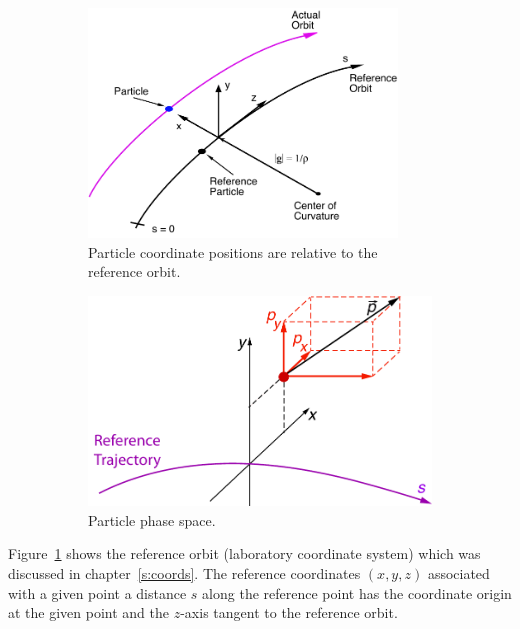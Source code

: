 \documentclass{hitec}     %
\begin{document}
{\begin{figure}[tb]
  \centering
  \begin{subfigure}[t]{0.48\textwidth}
    \includegraphics[width=0.9\textwidth]{figures/local-coords.pdf}
    \caption{Particle coordinate positions are relative to the reference orbit.}
    \label{f:part.coords}
  \end{subfigure}
  \hfil
  \begin{subfigure}[t]{0.48\textwidth}
    \includegraphics[width=\textwidth]{figures/CoordinateSystem1.pdf}
    \caption{Particle phase space.}
    \label{f:phase.space}
  \end{subfigure}
  \caption{}
\end{figure}

Figure~\ref{f:part.coords} shows the reference orbit (laboratory coordinate system) which was
discussed in chapter~\ref{s:coords}. The
reference coordinates $(x, y, z)$ associated with a given point a distance $s$ along the reference
point has the coordinate origin at the given point and the $z$-axis tangent to the reference orbit.

}
\end{document}
